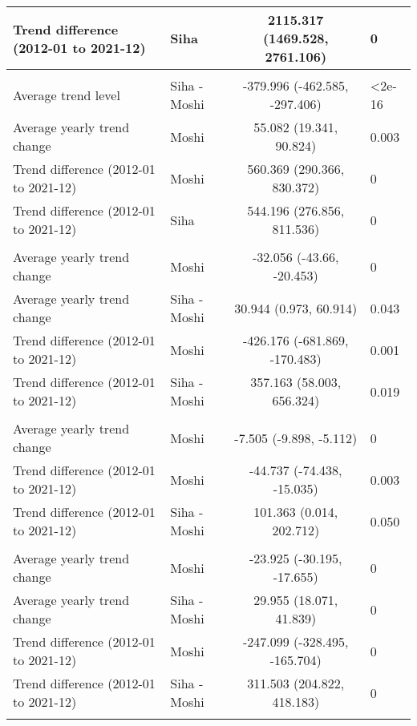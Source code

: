 \begin{longtable}{l|lcl}
Trend difference (2012-01 to 2021-12) & Siha & 2115.317 (1469.528, 2761.106) & 0 \\ 
\midrule\addlinespace[2.5pt]
\multicolumn{4}{l}{Urinary Tract Infections} \\ 
\midrule\addlinespace[2.5pt]
Average trend level & Siha - Moshi & -379.996 (-462.585, -297.406) & <2e-16 \\ 
Average yearly trend change & Moshi & 55.082 (19.341, 90.824) & 0.003 \\ 
Trend difference (2012-01 to 2021-12) & Moshi & 560.369 (290.366, 830.372) & 0 \\ 
Trend difference (2012-01 to 2021-12) & Siha & 544.196 (276.856, 811.536) & 0 \\ 
\midrule\addlinespace[2.5pt]
\multicolumn{4}{l}{Caries} \\ 
\midrule\addlinespace[2.5pt]
Average yearly trend change & Moshi & -32.056 (-43.66, -20.453) & 0 \\ 
Average yearly trend change & Siha - Moshi & 30.944 (0.973, 60.914) & 0.043 \\ 
Trend difference (2012-01 to 2021-12) & Moshi & -426.176 (-681.869, -170.483) & 0.001 \\ 
Trend difference (2012-01 to 2021-12) & Siha - Moshi & 357.163 (58.003, 656.324) & 0.019 \\ 
\midrule\addlinespace[2.5pt]
\multicolumn{4}{l}{Dysentery} \\ 
\midrule\addlinespace[2.5pt]
Average yearly trend change & Moshi & -7.505 (-9.898, -5.112) & 0 \\ 
Trend difference (2012-01 to 2021-12) & Moshi & -44.737 (-74.438, -15.035) & 0.003 \\ 
Trend difference (2012-01 to 2021-12) & Siha - Moshi & 101.363 (0.014, 202.712) & 0.050 \\ 
\midrule\addlinespace[2.5pt]
\multicolumn{4}{l}{Skin Infection - Fungal} \\ 
\midrule\addlinespace[2.5pt]
Average yearly trend change & Moshi & -23.925 (-30.195, -17.655) & 0 \\ 
Average yearly trend change & Siha - Moshi & 29.955 (18.071, 41.839) & 0 \\ 
Trend difference (2012-01 to 2021-12) & Moshi & -247.099 (-328.495, -165.704) & 0 \\ 
Trend difference (2012-01 to 2021-12) & Siha - Moshi & 311.503 (204.822, 418.183) & 0 \\ 
\midrule\addlinespace[2.5pt]
\multicolumn{4}{l}{Malnutrition} \\ 

\end{longtable}
